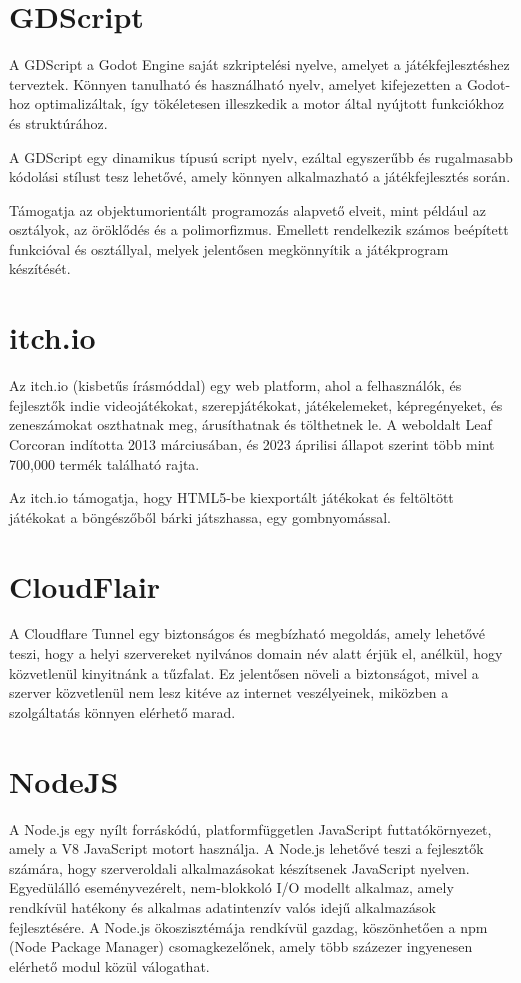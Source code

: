 \section{GDScript}
A GDScript a Godot Engine saját szkriptelési nyelve, amelyet a játékfejlesztéshez terveztek. 
Könnyen tanulható és használható nyelv, amelyet kifejezetten a Godot-hoz optimalizáltak, így tökéletesen illeszkedik a motor által nyújtott funkciókhoz és struktúrához.

A GDScript egy dinamikus típusú script nyelv, ezáltal egyszerűbb és rugalmasabb kódolási stílust tesz lehetővé, amely könnyen alkalmazható a játékfejlesztés során.

Támogatja az objektumorientált programozás alapvető elveit, mint például az osztályok, az öröklődés és a polimorfizmus. Emellett rendelkezik számos beépített funkcióval és osztállyal, melyek jelentősen megkönnyítik a játékprogram készítését.

\section{itch.io}
Az itch.io (kisbetűs írásmóddal) egy web platform, ahol a felhasználók, és fejlesztők indie videojátékokat, szerepjátékokat, játékelemeket, képregényeket, és zeneszámokat oszthatnak meg, árusíthatnak és tölthetnek le. A weboldalt Leaf Corcoran indította 2013 márciusában, és 2023 áprilisi állapot szerint több mint 700,000 termék található rajta.

Az itch.io támogatja, hogy HTML5-be kiexportált játékokat és feltöltött játékokat a böngészőből bárki játszhassa, egy gombnyomással.

\section{CloudFlair}
A Cloudflare Tunnel egy biztonságos és megbízható megoldás, amely lehetővé teszi, hogy a helyi szervereket nyilvános domain név alatt érjük el, anélkül, hogy közvetlenül kinyitnánk a tűzfalat. Ez jelentősen növeli a biztonságot, mivel a szerver közvetlenül nem lesz kitéve az internet veszélyeinek, miközben a szolgáltatás könnyen elérhető marad.

\section{NodeJS}
A Node.js egy nyílt forráskódú, platformfüggetlen JavaScript futtatókörnyezet, amely a V8 JavaScript motort használja. A Node.js lehetővé teszi a fejlesztők számára, hogy szerveroldali alkalmazásokat készítsenek JavaScript nyelven. Egyedülálló eseményvezérelt, nem-blokkoló I/O modellt alkalmaz, amely rendkívül hatékony és alkalmas adatintenzív valós idejű alkalmazások fejlesztésére. A Node.js ökoszisztémája rendkívül gazdag, köszönhetően a npm (Node Package Manager) csomagkezelőnek, amely több százezer ingyenesen elérhető modul közül válogathat.

